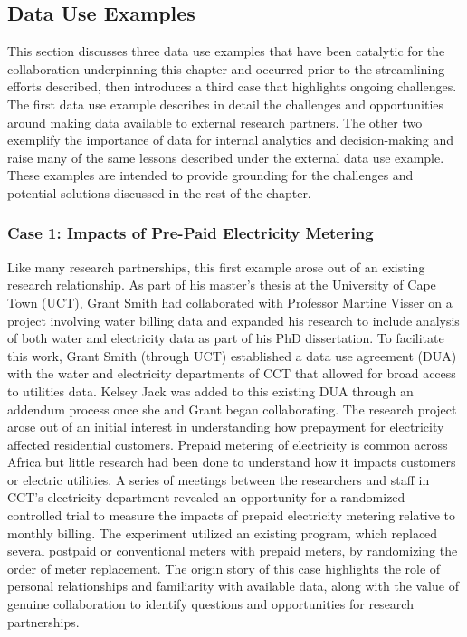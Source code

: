 \hypertarget{data-use-examples-5}{%
\subsection{Data Use Examples}\label{data-use-examples-5}}

This section discusses three data use examples that have been catalytic for the collaboration underpinning this chapter and occurred prior to the streamlining efforts described, then introduces a third case that highlights ongoing challenges. The first data use example describes in detail the challenges and opportunities around making data available to external research partners. The other two exemplify the importance of data for internal analytics and decision-making and raise many of the same lessons described under the external data use example. These examples are intended to provide grounding for the challenges and potential solutions discussed in the rest of the chapter.

\hypertarget{case-1-impacts-of-pre-paid-electricity-metering}{%
\subsubsection*{Case 1: Impacts of Pre-Paid Electricity Metering}\label{case-1-impacts-of-pre-paid-electricity-metering}}

Like many research partnerships, this first example arose out of an existing research relationship. As part of his master's thesis at the University of Cape Town (UCT), Grant Smith had collaborated with Professor Martine Visser on a project involving water billing data \citep{smith2014} and expanded his research to include analysis of both water and electricity data as part of his PhD dissertation. To facilitate this work, Grant Smith (through UCT) established a data use agreement (DUA) with the water and electricity departments of CCT that allowed for broad access to utilities data. Kelsey Jack was added to this existing DUA through an addendum process once she and Grant began collaborating. The research project arose out of an initial interest in understanding how prepayment for electricity affected residential customers. Prepaid metering of electricity is common across Africa but little research had been done to understand how it impacts customers or electric utilities. A series of meetings between the researchers and staff in CCT's electricity department revealed an opportunity for a randomized controlled trial to measure the impacts of prepaid electricity metering relative to monthly billing. The experiment utilized an existing program, which replaced several postpaid or conventional meters with prepaid meters, by randomizing the order of meter replacement. The origin story of this case highlights the role of personal relationships and familiarity with available data, along with the value of genuine collaboration to identify questions and opportunities for research partnerships.

